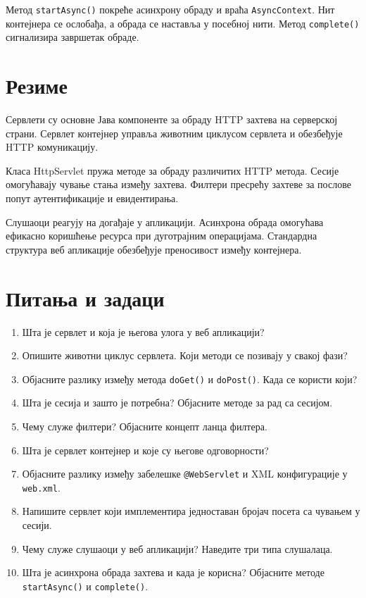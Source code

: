 Метод \texttt{startAsync()} покреће асинхрону обраду и враћа \texttt{AsyncContext}. Нит контејнера се ослобађа, а обрада се наставља у посебној нити. Метод \texttt{complete()} сигнализира завршетак обраде.


\section{Резиме}

Сервлети су основне Јава компоненте за обраду HTTP захтева на серверској страни. Сервлет контејнер управља животним циклусом сервлета и обезбеђује HTTP комуникацију.

Класа HttpServlet пружа методе за обраду различитих HTTP метода. Сесије омогућавају чување стања између захтева. Филтери пресрећу захтеве за послове попут аутентификације и евидентирања.

Слушаоци реагују на догађаје у апликацији. Асинхрона обрада омогућава ефикасно коришћење ресурса при дуготрајним операцијама. Стандардна структура веб апликације обезбеђује преносивост између контејнера.


\section{Питања и задаци}

\begin{enumerate}
\item Шта је сервлет и која је његова улога у веб апликацији?
\item Опишите животни циклус сервлета. Који методи се позивају у свакој фази?
\item Објасните разлику између метода \texttt{doGet()} и \texttt{doPost()}. Када се користи који?
\item Шта је сесија и зашто је потребна? Објасните методе за рад са сесијом.
\item Чему служе филтери? Објасните концепт ланца филтера.
\item Шта је сервлет контејнер и које су његове одговорности?
\item Објасните разлику између забелешке \texttt{@WebServlet} и XML конфигурације у \texttt{web.xml}.
\item Напишите сервлет који имплементира једноставан бројач посета са чувањем у сесији.
\item Чему служе слушаоци у веб апликацији? Наведите три типа слушалаца.
\item Шта је асинхрона обрада захтева и када је корисна? Објасните методе \texttt{startAsync()} и \texttt{complete()}.
\end{enumerate}


